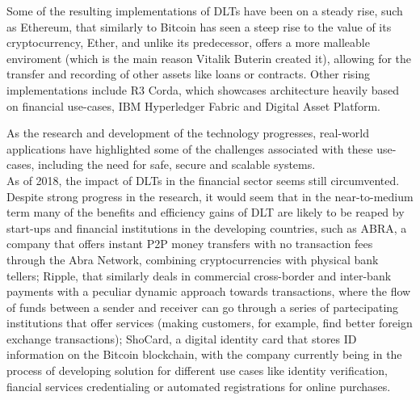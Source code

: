 Some of the resulting implementations of DLTs have been on a steady rise, such as Ethereum, that similarly to Bitcoin has seen a steep rise to the value of its cryptocurrency, Ether, and unlike its predecessor, offers a more malleable enviroment (which is the main reason Vitalik Buterin created it), allowing for the transfer and recording of other assets like loans or contracts. Other rising implementations include R3 Corda, which showcases architecture heavily based on financial use-cases, IBM Hyperledger Fabric and Digital Asset Platform.

As the research and development of the technology progresses, real-world applications have highlighted some of the challenges associated with these use-cases, including the need for safe, secure and scalable systems. \\

As of 2018, the impact of DLTs in the financial sector seems still circumvented. Despite strong progress in the research, it would seem that in the near-to-medium term many of the benefits and efficiency gains of DLT are likely to be reaped by start-ups and financial institutions in the developing countries, such as ABRA,\nocite{abracompany} a company that offers instant P2P money transfers with no transaction fees through the Abra Network, combining cryptocurrencies with physical bank tellers; Ripple,\nocite{ripplecompany} that similarly deals in commercial cross-border and inter-bank payments with a peculiar dynamic approach towards transactions, where the flow of funds between a sender and receiver can go through a series of partecipating institutions that offer services (making customers, for example, find better foreign exchange transactions); ShoCard,\nocite{shocardcompany} a digital identity card that stores ID information on the Bitcoin blockchain, with the company currently being in the process of developing solution for different use cases like identity verification, fiancial services credentialing or automated registrations for online purchases. \\



